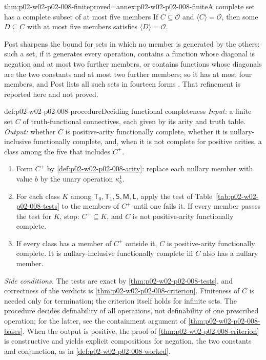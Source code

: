 \begin{hbcorollary}{thm:p02-w02-p02-008-finite}{proved=annex:p02-w02-p02-008-finite}{A complete set has a complete subset of at most five members}
If \(C\subseteq\mathcal O\) and \(\langle C\rangle=\mathcal O\), then some
\(D\subseteq C\) with at most five members satisfies
\(\langle D\rangle=\mathcal O\).
\end{hbcorollary}

Post sharpens the bound for sets in which no member is generated by the
others: such a set, if it generates every operation, contains a function
whose diagonal is negation and at most two further members, or contains
functions whose diagonals are the two constants and at most two further
members; so it has at most four members, and Post lists all such sets in
fourteen forms \cite[\S\,26, pp.~105--107]{Post1941}.  That refinement is
reported here and not proved.

\begin{hbmethod}{def:p02-w02-p02-008-procedure}{Deciding functional completeness}
\emph{Input:} a finite set \(C\) of truth-functional connectives, each given
by its arity and truth table.  \emph{Output:} whether \(C\) is
positive-arity functionally complete, whether it is nullary-inclusive
functionally complete, and, when it is not complete for positive arities, a
class among the five that includes \(C^+\).
\begin{enumerate}
\item Form \(C^+\) by \cref{def:p02-w02-p02-008-arity}: replace each nullary
  member with value \(b\) by the unary operation \(\kappa^1_b\).
\item For each class \(K\) among \(\mathsf T_0,\mathsf T_1,\mathsf S,
  \mathsf M,\mathsf L\), apply the test of
  Table~\ref{tab:p02-w02-p02-008-tests} to the members of \(C^+\) until one
  fails it.  If every member passes the test for \(K\), stop: \(C^+\subseteq
  K\), and \(C\) is not positive-arity functionally complete.
\item If every class has a member of \(C^+\) outside it, \(C\) is
  positive-arity functionally complete.  It is nullary-inclusive
  functionally complete iff \(C\) also has a nullary member.
\end{enumerate}
\emph{Side conditions.}  The tests are exact by
\cref{thm:p02-w02-p02-008-tests}, and correctness of the verdicts is
\cref{thm:p02-w02-p02-008-criterion}.  Finiteness of \(C\) is needed only for
termination; the criterion itself holds for infinite sets.  The procedure
decides definability of all operations, not definability of one prescribed
operation; for the latter, see the containment argument of
\cref{thm:p02-w02-p02-008-bases}.  When the output is positive, the proof of
\cref{thm:p02-w02-p02-008-criterion} is constructive and yields explicit
compositions for negation, the two constants and conjunction, as in
\cref{def:p02-w02-p02-008-worked}.
\end{hbmethod}

